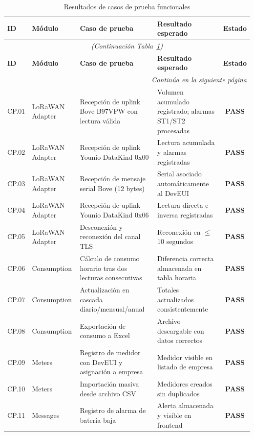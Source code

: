 \documentclass[12pt,a4paper,oneside]{report}
\begin{document}
\begin{longtable}{llp{3.8cm}p{3.0cm}c}
\caption{Resultados de casos de prueba funcionales}\label{tab:pruebas} \\
\toprule
\textbf{ID} & \textbf{Módulo} & \textbf{Caso de prueba} & \textbf{Resultado esperado} & \textbf{Estado} \\
\midrule
\endfirsthead
\multicolumn{5}{c}{\textit{(Continuación Tabla~\ref{tab:pruebas})}} \\
\toprule
\textbf{ID} & \textbf{Módulo} & \textbf{Caso de prueba} & \textbf{Resultado esperado} & \textbf{Estado} \\
\midrule
\endhead
\midrule
\multicolumn{5}{r}{\textit{Continúa en la siguiente página}} \\
\endfoot
\bottomrule
\endlastfoot
CP.01 & LoRaWAN Adapter & Recepción de uplink Bove B97VPW con lectura válida & Volumen acumulado registrado; alarmas ST1/ST2 procesadas & \textbf{PASS} \\
CP.02 & LoRaWAN Adapter & Recepción de uplink Younio DataKind 0x00 & Lectura acumulada y alarmas registradas & \textbf{PASS} \\
CP.03 & LoRaWAN Adapter & Recepción de mensaje serial Bove (12 bytes) & Serial asociado automáticamente al DevEUI & \textbf{PASS} \\
CP.04 & LoRaWAN Adapter & Recepción de uplink Younio DataKind 0x06 & Lectura directa e inversa registradas & \textbf{PASS} \\
CP.05 & LoRaWAN Adapter & Desconexión y reconexión del canal TLS & Reconexión en $\leq$ 10 segundos & \textbf{PASS} \\
CP.06 & Consumption & Cálculo de consumo horario tras dos lecturas consecutivas & Diferencia correcta almacenada en tabla horaria & \textbf{PASS} \\
CP.07 & Consumption & Actualización en cascada diario/mensual/anual & Totales actualizados consistentemente & \textbf{PASS} \\
CP.08 & Consumption & Exportación de consumo a Excel & Archivo descargable con datos correctos & \textbf{PASS} \\
CP.09 & Meters & Registro de medidor con DevEUI y asignación a empresa & Medidor visible en listado de empresa & \textbf{PASS} \\
CP.10 & Meters & Importación masiva desde archivo CSV & Medidores creados sin duplicados & \textbf{PASS} \\
CP.11 & Messages & Registro de alarma de batería baja & Alerta almacenada y visible en frontend & \textbf{PASS} \\

\end{longtable}
\end{document}
